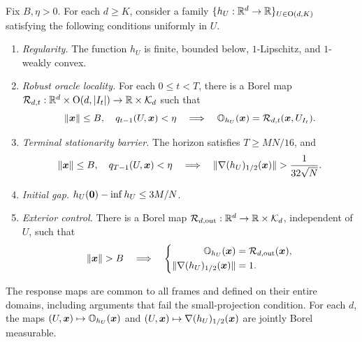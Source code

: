 \begin{condition}
\label{cond:abstract-framework}
Fix $B,\eta>0$. For each $d\ge K$, consider a family
$\{h_U:{\mathbb{R}}^d\to{\mathbb{R}}\}_{U\in\operatorname O(d,K)}$ satisfying
the following conditions uniformly in $U$.
\begin{enumerate}[label=\textnormal{(C\arabic*)},leftmargin=*]
\item\label{cond:framework-regularity}
\emph{Regularity.}
The function $h_U$ is finite, bounded below, $1$-Lipschitz,
and $1$-weakly convex.

\item\label{cond:framework-locality}
\emph{Robust oracle locality.}
For each $0\le t<T$, there is a Borel map
$\mathcal R_{d,t}:{\mathbb{R}}^d\times\operatorname O(d,|I_t|)
\to{\mathbb{R}}\times\mathcal K_d$ such that
\begin{equation}
 \|\bm{x}\|\le B,\quad q_{t-1}(U,\bm{x})<\eta
 \quad\Longrightarrow\quad
 \mathbb O_{h_U}(\bm{x})=\mathcal R_{d,t}(\bm{x},U_{I_t}).
 \label{eq:framework-locality}
\end{equation}

\item\label{cond:framework-barrier}
\emph{Terminal stationarity barrier.}
The horizon satisfies $T\ge MN/16$, and
\begin{equation}
 \|\x\|\le B,\quad q_{T-1}(U,\x)<\eta
 \quad\Longrightarrow\quad
 \|\nabla(h_U)_{1/2}(\x)\|>\frac1{32\sqrt N}.
 \label{eq:framework-barrier}
\end{equation}

\item\label{cond:framework-gap}
\emph{Initial gap.}
$h_U({\mathbf 0})-\inf h_U\le3M/N$.

\item\label{cond:framework-exterior}
\emph{Exterior control.}
There is a Borel map
$\mathcal R_{d,\mathrm{out}}:{\mathbb{R}}^d\to{\mathbb{R}}\times\mathcal K_d$,
independent of $U$, such that
\begin{equation}
 \|\x\|>B
 \quad\Longrightarrow\quad
 \left\{
 \begin{aligned}
 \mathbb O_{h_U}(\x)&=\mathcal R_{d,\mathrm{out}}(\x),\\
 \|\nabla(h_U)_{1/2}(\x)\|&=1.
 \end{aligned}
 \right.
 \label{eq:framework-exterior}
\end{equation}
\end{enumerate}
The response maps are common to all frames and defined on their
entire domains, including arguments that fail the small-projection
condition. For each $d$, the maps
$(U,\bm{x})\mapsto\mathbb O_{h_U}(\bm{x})$ and
$(U,\bm{x})\mapsto\nabla(h_U)_{1/2}(\bm{x})$ are jointly Borel measurable.
\end{condition}

